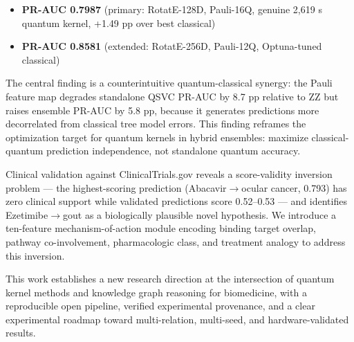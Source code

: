 \documentclass[twocolumn,10pt]{article}
\begin{document}
\begin{itemize}[leftmargin=*]
\item \textbf{PR-AUC 0.7987} (primary: RotatE-128D, Pauli-16Q, genuine 2,619 s quantum kernel, +1.49 pp over best classical)
\item \textbf{PR-AUC 0.8581} (extended: RotatE-256D, Pauli-12Q, Optuna-tuned classical)
\end{itemize}

The central finding is a counterintuitive quantum-classical synergy: the Pauli feature map degrades standalone QSVC PR-AUC by 8.7 pp relative to ZZ but raises ensemble PR-AUC by 5.8 pp, because it generates predictions more decorrelated from classical tree model errors. This finding reframes the optimization target for quantum kernels in hybrid ensembles: maximize classical-quantum prediction independence, not standalone quantum accuracy.

Clinical validation against ClinicalTrials.gov reveals a score-validity inversion problem --- the highest-scoring prediction (Abacavir$\to$ocular cancer, 0.793) has zero clinical support while validated predictions score 0.52--0.53 --- and identifies Ezetimibe$\to$gout as a biologically plausible novel hypothesis. We introduce a ten-feature mechanism-of-action module encoding binding target overlap, pathway co-involvement, pharmacologic class, and treatment analogy to address this inversion.

This work establishes a new research direction at the intersection of quantum kernel methods and knowledge graph reasoning for biomedicine, with a reproducible open pipeline, verified experimental provenance, and a clear experimental roadmap toward multi-relation, multi-seed, and hardware-validated results.

\end{document}
